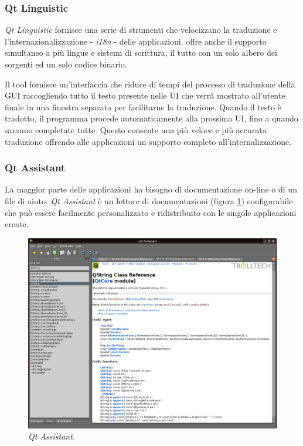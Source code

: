 \subsubsection{Qt Linguistic}
\emph{Qt Linguistic} fornisce una serie di strumenti che velocizzano la traduzione e l'internazionalizzazione - \emph{i18n} - delle applicazioni. \qt{} offre anche il supporto simultaneo a più lingue e sistemi di scrittura, il tutto con un solo albero dei sorgenti ed un solo codice binario.

Il tool fornisce un'interfaccia che riduce di tempi del processo di traduzione della GUI raccogliendo tutto il testo presente nelle UI che verrà mostrato all'utente finale in una finestra separata per facilitarne la traduzione. Quando il testo è tradotto, il programma procede automaticamente alla prossima UI, fino a quando saranno completate tutte. Questo consente una più veloce e più accurata traduzione offrendo alle applicazioni un supporto completo all'internalizzazione.

\subsubsection{Qt Assistant}
La maggior parte delle applicazioni ha bisogno di documentazione on-line o di un file di aiuto. \emph{Qt Assistant} è un lettore di documentazioni (figura \ref{figura:qtassistant}) configurabile che può essere facilmente personalizzato e ridistribuito con le singole applicazioni create.

\begin{figure}[!htb]
	\centering
	\includegraphics[width=12cm]{images/qtassistant.png}
	\caption{\emph{Qt Assistant}.}
	\label{figura:qtassistant}
\end{figure}

